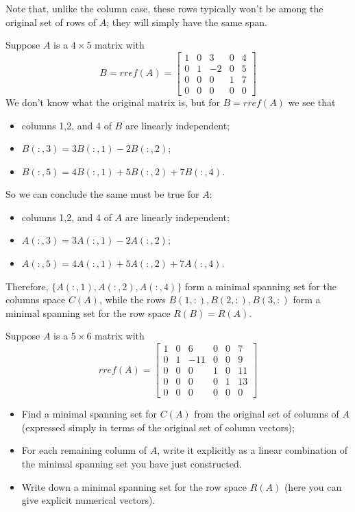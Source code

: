 \documentclass{ximera}
\begin{document}
Note that, unlike the column case, these rows typically won't be among the original set of rows of $A$; they will simply have the same span.


\begin{example} Suppose $A$ is a $4\times 5$ matrix with 
\[
B = rref(A) = \begin{bmatrix}
1 & 0 & 3 & 0 & 4\\
0 & 1 & -2 & 0 & 5\\
0 & 0 & 0 & 1 & 7\\
0 & 0 & 0 & 0 & 0
\end{bmatrix}
\]
We don't know what the original matrix is, but for $B = rref(A)$ we see that
\begin{itemize}
\item columns 1,2, and 4 of $B$ are linearly independent;
\item $B(:,3) = 3B(:,1) - 2B(:,2)$;
\item $B(:,5) = 4B(:,1) + 5B(:,2) + 7B(:,4)$.
\end{itemize}
So we can conclude the same must be true for $A$: 
\begin{itemize}
\item columns 1,2, and 4 of $A$ are linearly independent;
\item $A(:,3) = 3A(:,1) - 2A(:,2)$;
\item $A(:,5) = 4A(:,1) + 5A(:,2) + 7A(:,4)$.
\end{itemize}
Therefore, $\{A(:,1), A(:,2), A(:,4)\}$ form a minimal spanning set for the columns space $C(A)$, while the rows $B(1,:), B(2,:), B(3,:)$ form a minimal spanning set for the row space $R(B) = R(A)$.
\end{example}

\begin{exercise} Suppose $A$ is a $5\times 6$ matrix with
\[
rref(A) = \begin{bmatrix}
1 & 0 & 6 & 0 & 0 & 7\\
0 & 1 & -11 & 0 & 0 & 9\\
0 & 0 & 0 & 1 & 0 & 11\\
0 & 0 & 0 & 0 & 1 & 13\\
0 & 0 & 0 & 0 & 0 & 0
\end{bmatrix}
\]
\begin{itemize}
\item Find a minimal spanning set for $C(A)$ from the original set of columns of $A$ (expressed simply in terms of the original set of column vectors);
\item For each remaining column of $A$, write it explicitly as a linear combination of the minimal spanning set you have just constructed.
\item Write down a minimal spanning set for the row space $R(A)$ (here you can give explicit numerical vectors).
\end{itemize}

\end{exercise}
\end{document}
